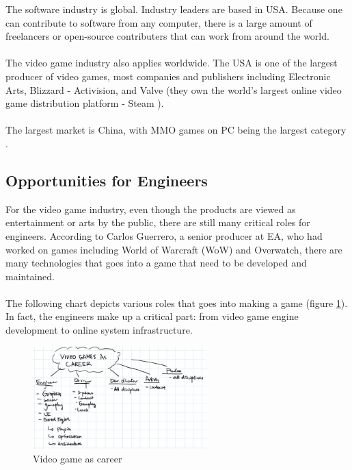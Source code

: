\documentclass[10pt,letterpaper]{article}
\begin{document}
The software industry is global. Industry leaders are based in USA. Because one can contribute to software from any computer, there is a large amount of freelancers or open-source contributers that can work from around the world.\\
\\
The video game industry also applies worldwide. The USA is one of the largest producer of video games, most companies and publishers including Electronic Arts, Blizzard - Activision, and Valve (they own the world's largest online video game distribution platform - Steam \cite{steam}).\\
\\
The largest market is China, with MMO games on PC being the largest category \cite{video-game-china}\cite{big-game-china}.

\subsection{Opportunities for Engineers}

For the video game industry, even though the products are viewed as entertainment or arts by the public, there are still many critical roles for engineers. According to Carlos Guerrero, a senior producer at EA, who had worked on games including World of Warcraft (WoW) and Overwatch, there are many technologies that goes into a game that need to be developed and maintained.\\
\\
The following chart depicts various roles that goes into making a game (figure \ref{fig:video-game-as-career}). In fact, the engineers make up a critical part: from video game engine development to online system infrastructure.\\

\begin{figure}[H]
	\centering
	\includegraphics[width=0.6\textwidth]{assets/video-games-career-roles}
	\caption{Video game as career}
	\label{fig:video-game-as-career}
\end{figure}
\end{document}
